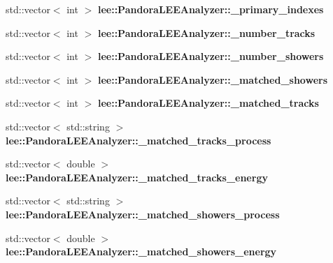 \begin{DoxyCompactItemize}
\item 
\hypertarget{group__lee_ga3020305a22a83591e103b8124140cea6}{std\-::vector$<$ int $>$ {\bfseries lee\-::\-Pandora\-L\-E\-E\-Analyzer\-::\-\_\-primary\-\_\-indexes}}\label{group__lee_ga3020305a22a83591e103b8124140cea6}

\item 
\hypertarget{group__lee_ga413d54bca989124f2aaec5837c930a22}{std\-::vector$<$ int $>$ {\bfseries lee\-::\-Pandora\-L\-E\-E\-Analyzer\-::\-\_\-number\-\_\-tracks}}\label{group__lee_ga413d54bca989124f2aaec5837c930a22}

\item 
\hypertarget{group__lee_ga636e7f5eece11bbd0d0188ea073c1ee5}{std\-::vector$<$ int $>$ {\bfseries lee\-::\-Pandora\-L\-E\-E\-Analyzer\-::\-\_\-number\-\_\-showers}}\label{group__lee_ga636e7f5eece11bbd0d0188ea073c1ee5}

\item 
\hypertarget{group__lee_ga51ecdfb466b876fde01072e95408bedb}{std\-::vector$<$ int $>$ {\bfseries lee\-::\-Pandora\-L\-E\-E\-Analyzer\-::\-\_\-matched\-\_\-showers}}\label{group__lee_ga51ecdfb466b876fde01072e95408bedb}

\item 
\hypertarget{group__lee_ga31e3e0db2ea3526c148ab1d98cd3b35c}{std\-::vector$<$ int $>$ {\bfseries lee\-::\-Pandora\-L\-E\-E\-Analyzer\-::\-\_\-matched\-\_\-tracks}}\label{group__lee_ga31e3e0db2ea3526c148ab1d98cd3b35c}

\item 
\hypertarget{group__lee_gaf01f5331ecedef37034b5e8a12aac314}{std\-::vector$<$ std\-::string $>$ {\bfseries lee\-::\-Pandora\-L\-E\-E\-Analyzer\-::\-\_\-matched\-\_\-tracks\-\_\-process}}\label{group__lee_gaf01f5331ecedef37034b5e8a12aac314}

\item 
\hypertarget{group__lee_ga3cd167b0e0e259df8c58bed1190edd85}{std\-::vector$<$ double $>$ {\bfseries lee\-::\-Pandora\-L\-E\-E\-Analyzer\-::\-\_\-matched\-\_\-tracks\-\_\-energy}}\label{group__lee_ga3cd167b0e0e259df8c58bed1190edd85}

\item 
\hypertarget{group__lee_ga68fdfb9878716c7d99651a98e294818d}{std\-::vector$<$ std\-::string $>$ {\bfseries lee\-::\-Pandora\-L\-E\-E\-Analyzer\-::\-\_\-matched\-\_\-showers\-\_\-process}}\label{group__lee_ga68fdfb9878716c7d99651a98e294818d}

\item 
\hypertarget{group__lee_ga8c616d054941206de6a91e7859ac4209}{std\-::vector$<$ double $>$ {\bfseries lee\-::\-Pandora\-L\-E\-E\-Analyzer\-::\-\_\-matched\-\_\-showers\-\_\-energy}}\label{group__lee_ga8c616d054941206de6a91e7859ac4209}


\end{DoxyCompactItemize}
